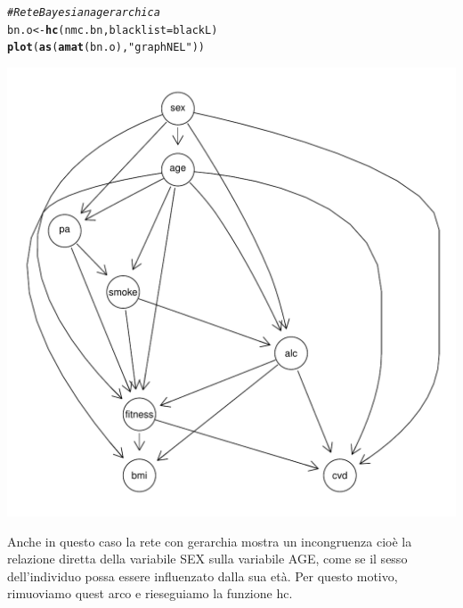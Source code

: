 \documentclass{article}\usepackage[]{graphicx}\usepackage[]{xcolor}
\makeatletter
\def\maxwidth{ %
  \ifdim\Gin@nat@width>\linewidth
    \linewidth
  \else
    \Gin@nat@width
  \fi
}
\newcommand{\hlstr}[1]{\textcolor[rgb]{0.192,0.494,0.8}{#1}}%
\newcommand{\hlcom}[1]{\textcolor[rgb]{0.678,0.584,0.686}{\textit{#1}}}%
\newcommand{\hlstd}[1]{\textcolor[rgb]{0.345,0.345,0.345}{#1}}%
\newcommand{\hlkwb}[1]{\textcolor[rgb]{0.69,0.353,0.396}{#1}}%
\newcommand{\hlkwc}[1]{\textcolor[rgb]{0.333,0.667,0.333}{#1}}%
\newcommand{\hlkwd}[1]{\textcolor[rgb]{0.737,0.353,0.396}{\textbf{#1}}}%
\newenvironment{kframe}{%
 \def\at@end@of@kframe{}%
 \ifinner\ifhmode%
  \def\at@end@of@kframe{\end{minipage}}%
  \begin{minipage}{\columnwidth}%
 \fi\fi%
 \def\FrameCommand##1{\hskip\@totalleftmargin \hskip-\fboxsep
 \colorbox{shadecolor}{##1}\hskip-\fboxsep
     \hskip-\linewidth \hskip-\@totalleftmargin \hskip\columnwidth}%
 \MakeFramed {\advance\hsize-\width
   \@totalleftmargin\z@ \linewidth\hsize
   \@setminipage}}%
 {\par\unskip\endMakeFramed%
 \at@end@of@kframe}
\newenvironment{knitrout}{}{} %
\makeatother
\begin{document}
\begin{knitrout}
\color{fgcolor}\begin{kframe}
\begin{alltt}
\hlcom{#Rete Bayesiana gerarchica}
\hlstd{bn.o} \hlkwb{<-} \hlkwd{hc}\hlstd{(nmc.bn,} \hlkwc{blacklist}\hlstd{=blackL)}
\hlkwd{plot}\hlstd{(}\hlkwd{as}\hlstd{(}\hlkwd{amat}\hlstd{(bn.o),} \hlstr{"graphNEL"}\hlstd{))}
\end{alltt}
\end{kframe}
\includegraphics[width=\maxwidth]{figure/Rete_bayesiana_gerarchica-1} 
\end{knitrout}
    
    Anche in questo caso la rete con gerarchia mostra un incongruenza cioè la
    relazione diretta della variabile SEX sulla variabile AGE, come se il sesso 
    dell'individuo possa essere influenzato dalla sua età. Per questo motivo, 
    rimuoviamo quest arco e rieseguiamo la funzione hc.
    
\end{document}
